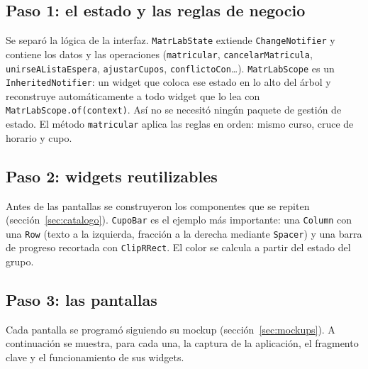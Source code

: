
\subsection{Paso 1: el estado y las reglas de negocio}
Se separó la lógica de la interfaz. \texttt{MatrLabState} extiende \texttt{ChangeNotifier} y contiene los datos y las operaciones (\texttt{matricular}, \texttt{cancelarMatricula}, \texttt{unirseAListaEspera}, \texttt{ajustarCupos}, \texttt{conflictoCon}\ldots). \texttt{MatrLabScope} es un \texttt{InheritedNotifier}: un widget que coloca ese estado en lo alto del árbol y reconstruye automáticamente a todo widget que lo lea con \texttt{MatrLabScope.of(context)}. Así no se necesitó ningún paquete de gestión de estado. El método \texttt{matricular} aplica las reglas en orden: mismo curso, cruce de horario y cupo.




\subsection{Paso 2: widgets reutilizables}
Antes de las pantallas se construyeron los componentes que se repiten (sección~\ref{sec:catalogo}). \texttt{CupoBar} es el ejemplo más importante: una \texttt{Column} con una \texttt{Row} (texto a la izquierda, fracción a la derecha mediante \texttt{Spacer}) y una barra de progreso recortada con \texttt{ClipRRect}. El color se calcula a partir del estado del grupo.



\subsection{Paso 3: las pantallas}
Cada pantalla se programó siguiendo su mockup (sección~\ref{sec:mockups}). A continuación se muestra, para cada una, la captura de la aplicación, el fragmento clave y el funcionamiento de sus widgets.

